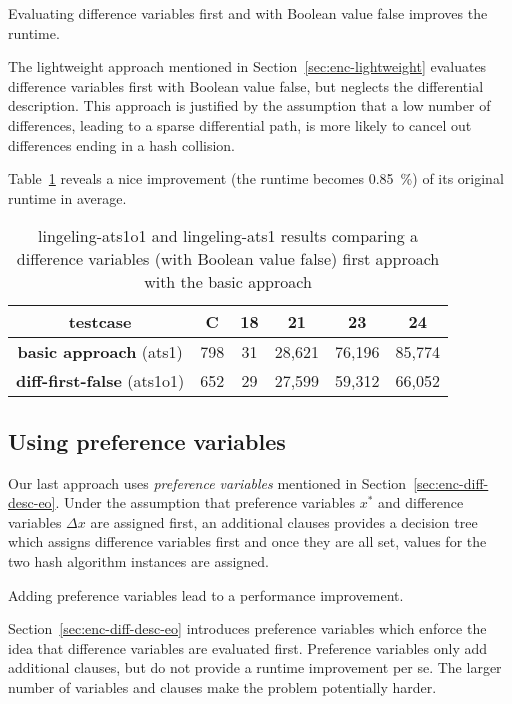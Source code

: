 \begin{prop}
  Evaluating difference variables first and with Boolean value false improves the runtime.
\end{prop}
%
The lightweight approach mentioned in Section~\ref{sec:enc-lightweight}
evaluates difference variables first with Boolean value false,
but neglects the differential description.
This approach is justified by the assumption that a low number of differences,
leading to a sparse differential path, is more likely to cancel out differences
ending in a hash collision.

Table~\ref{tab:diff-first-false-results} reveals a nice improvement (the runtime
becomes 0.85~\%) of its original runtime in average.

\begin{table}[!h]
  \begin{center}
    \begin{tabular}{c|c|cccc}
      \textbf{testcase}                   & \textbf{C} & \textbf{18} & \textbf{21} & \textbf{23} & \textbf{24} \\
    \hline
      \textbf{basic approach}      (ats1) &        798 &          31 &      28,621 &      76,196 &      85,774 \\
      \textbf{diff-first-false}  (ats1o1) &        652 &          29 &      27,599 &      59,312 &      66,052
    \end{tabular}
    \caption[Difference variables first (with Boolean value false) results]{
      lingeling-ats1o1 and lingeling-ats1 results
      comparing a difference variables (with Boolean value false) first approach
      with the basic approach
    }
    \label{tab:diff-first-false-results}
  \end{center}
\end{table}

\subsection{Using preference variables}
\label{sec:preference-variables}
%
Our last approach uses \emph{preference variables} mentioned in
Section~\ref{sec:enc-diff-desc-eo}. Under the assumption that
preference variables $x^*$ and difference variables $\Delta x$
are assigned first, an additional clauses provides a decision tree
which assigns difference variables first and once they are all set,
values for the two hash algorithm instances are assigned.

\begin{prop}
  Adding preference variables lead to a performance improvement.
\end{prop}
%
Section~\ref{sec:enc-diff-desc-eo} introduces preference variables
which enforce the idea that difference variables are evaluated first.
Preference variables only add additional clauses, but do not provide
a runtime improvement per se. The larger number of variables and
clauses make the problem potentially harder.

